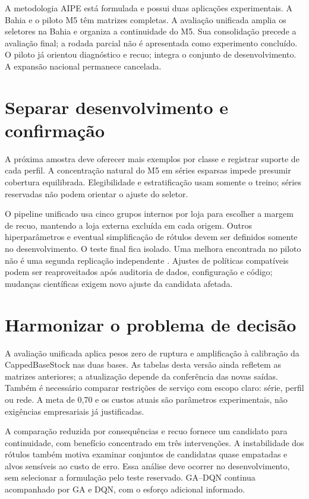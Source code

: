 
A metodologia AIPE está formulada e possui duas aplicações experimentais. A Bahia e o piloto M5 têm matrizes completas. A avaliação unificada amplia os seletores na Bahia e organiza a continuidade do M5. Sua consolidação precede a avaliação final; a rodada parcial não é apresentada como experimento concluído. O piloto já orientou diagnóstico e recuo; integra o conjunto de desenvolvimento. A expansão nacional permanece cancelada.

\section{Separar desenvolvimento e confirmação}
\label{sec:estudos_caso_adicionais}
A próxima amostra deve oferecer mais exemplos por classe e registrar suporte de cada perfil. A concentração natural do M5 em séries esparsas impede presumir cobertura equilibrada. Elegibilidade e estratificação usam somente o treino; séries reservadas não podem orientar o ajuste do seletor.

O pipeline unificado usa cinco grupos internos por loja para escolher a margem de recuo, mantendo a loja externa excluída em cada origem. Outros hiperparâmetros e eventual simplificação de rótulos devem ser definidos somente no desenvolvimento. O teste final fica isolado. Uma melhora encontrada no piloto não é uma segunda replicação independente \citep{CawleyTalbot2010}. Ajustes de políticas compatíveis podem ser reaproveitados após auditoria de dados, configuração e código; mudanças científicas exigem novo ajuste da candidata afetada.

\section{Harmonizar o problema de decisão}
A avaliação unificada aplica pesos zero de ruptura e amplificação à calibração da CappedBaseStock nas duas bases. As tabelas desta versão ainda refletem as matrizes anteriores; a atualização depende da conferência das novas saídas. Também é necessário comparar restrições de serviço com escopo claro: série, perfil ou rede. A meta de 0,70 e os custos atuais são parâmetros experimentais, não exigências empresariais já justificadas.

A comparação reduzida por consequências e recuo fornece um candidato para continuidade, com benefício concentrado em três intervenções. A instabilidade dos rótulos também motiva examinar conjuntos de candidatas quase empatadas e alvos sensíveis ao custo de erro. Essa análise deve ocorrer no desenvolvimento, sem selecionar a formulação pelo teste reservado. GA--DQN continua acompanhado por GA e DQN, com o esforço adicional informado.

